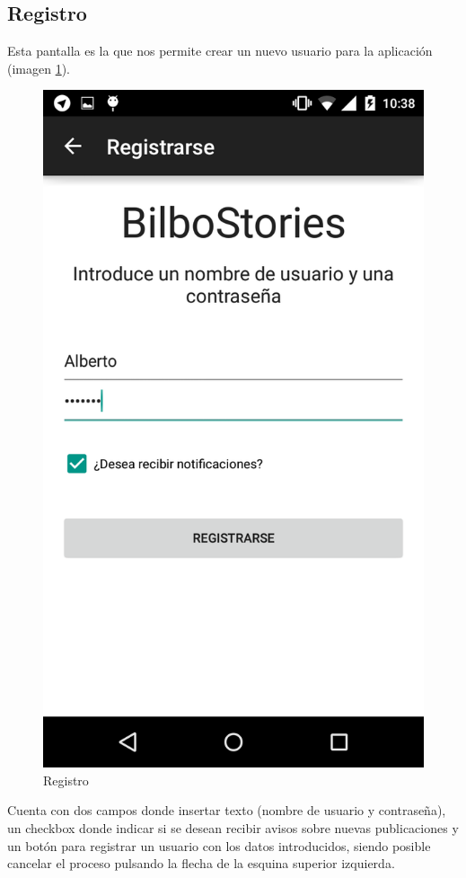\documentclass[11pt,a4paper, titlepage]{article}
\begin{document}
	\FloatBarrier
	
	\newpage
	\subsection[Registro]{Registro}
	\label{regis}
	
	Esta pantalla es la que nos permite crear un nuevo usuario para la aplicación (imagen \ref{p14}). 
	
	\begin{figure}[hbtp]
		\centering
		\includegraphics[scale = 0.25 ]{img/2}
		\caption{Registro}
		\label{p14}
	\end{figure}
Cuenta con dos campos donde insertar texto (nombre de usuario y contraseña), un checkbox donde indicar si se desean recibir avisos sobre nuevas publicaciones y un botón para registrar un usuario con los datos introducidos, siendo posible cancelar el proceso pulsando la flecha de la esquina superior izquierda.
\end{document}
